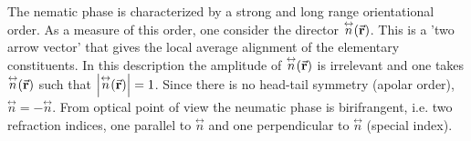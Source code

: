 \documentclass[../main/main.tex]{subfiles}
\begin{document}
The nematic phase is characterized by a strong and long range orientational order. As a measure of this order, one consider the director \( \overset{\leftrightarrow}{n} (\va{r}) \). This is a 'two arrow vector' that gives the local average alignment of the elementary constituents. In this description the amplitude of \( \overset{\leftrightarrow}{n} (\va{r}) \)    is irrelevant and one takes \( \overset{\leftrightarrow}{n} (\va{r}) \) such that \( \abs{\overset{\leftrightarrow}{n} (\va{r})}  =1 \). Since there is no head-tail symmetry (apolar order), \( \overset{\leftrightarrow}{n} = -  \overset{\leftrightarrow}{n}  \).
From optical point of view the neumatic phase is birifrangent, i.e. two refraction indices, one parallel to \( \overset{\leftrightarrow}{n}  \) and one perpendicular to \( \overset{\leftrightarrow}{n}  \) (special index).
\end{document}
